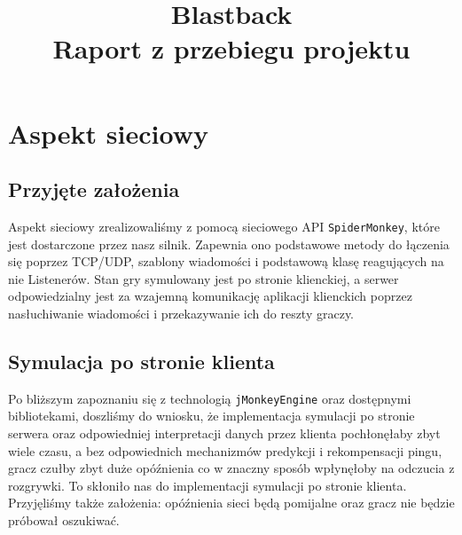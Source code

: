 \documentclass[]{report}
\newcommand{\code}[1]{\colorbox{codegray}{\texttt{#1}}}
\begin{document}
\title{Blastback \\
	\Large Raport z przebiegu projektu}
\maketitle



\chapter*{Aspekt sieciowy}
\section{Przyjęte założenia}
Aspekt sieciowy zrealizowaliśmy z pomocą sieciowego API \code{SpiderMonkey}, które jest dostarczone przez nasz silnik. Zapewnia ono podstawowe metody do łączenia się poprzez TCP/UDP, szablony wiadomości i podstawową klasę reagujących na nie Listenerów. Stan gry symulowany jest po stronie klienckiej, a serwer odpowiedzialny jest za wzajemną komunikację aplikacji klienckich poprzez nasłuchiwanie wiadomości i przekazywanie ich do reszty graczy.

\section{Symulacja po stronie klienta}
Po bliższym zapoznaniu się z technologią \code{jMonkeyEngine} oraz dostępnymi bibliotekami, doszliśmy do wniosku, że implementacja symulacji po stronie serwera oraz odpowiedniej interpretacji danych przez klienta pochłonęłaby zbyt wiele czasu, a bez odpowiednich mechanizmów predykcji i rekompensacji pingu, gracz czułby zbyt duże opóźnienia co w znaczny sposób wpłynęłoby na odczucia z rozgrywki. To skłoniło nas do implementacji symulacji po stronie klienta. Przyjęliśmy także założenia: opóźnienia sieci będą pomijalne oraz gracz nie będzie próbował oszukiwać.
\end{document}
